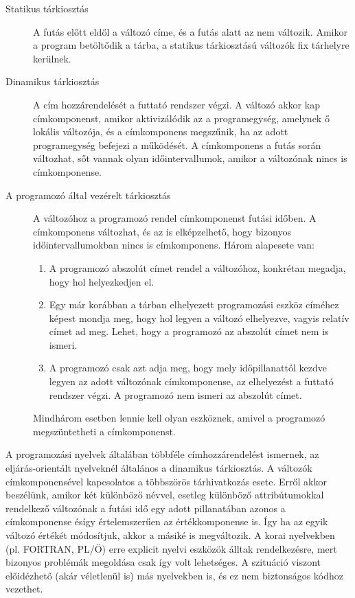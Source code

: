 \begin{description}
	\item[Statikus tárkiosztás] A futás előtt eldől a változó címe, és a futás alatt az nem változik. Amikor a program betöltődik a tárba, a statikus tárkiosztású változók fix tárhelyre kerülnek.
	\item[Dinamikus tárkiosztás] A cím hozzárendelését a futtató rendszer végzi. A változó akkor kap címkomponenst, amikor aktivizálódik az a programegység, amelynek ő lokális változója, és a címkomponens megszűnik, ha az adott programegység befejezi a működését. A címkomponens a futás során változhat, sőt vannak olyan időintervallumok, amikor a változónak nincs is címkomponense. \item[A programozó által vezérelt tárkiosztás] A változóhoz a programozó rendel címkomponenst futási időben. A címkomponens változhat, és az is elképzelhető, hogy bizonyos időintervallumokban nincs is címkomponens. Három alapesete van:
	\begin{enumerate}[noitemsep]
		\item A programozó abszolút címet rendel a változóhoz, konkrétan megadja, hogy hol helyezkedjen el.
		\item Egy már korábban a tárban elhelyezett programozási eszköz címéhez képest mondja meg, hogy hol legyen a változó elhelyezve, vagyis relatív címet ad meg. Lehet, hogy a programozó az abszolút címet nem is ismeri.
		\item A programozó csak azt adja meg, hogy mely időpillanattól kezdve legyen az adott változónak   címkomponense, az elhelyezést a futtató rendszer végzi. A programozó nem ismeri az abszolút címet.
	\end{enumerate}
	Mindhárom esetben lennie kell olyan eszköznek, amivel a programozó megszüntetheti a címkomponenst.
\end{description}
A programozási nyelvek általában többféle címhozzárendelést ismernek, az eljárás-orientált nyelveknél általános a dinamikus tárkiosztás. A változók címkomponensével kapcsolatos a többszörös tárhivatkozás esete. Erről akkor beszélünk, amikor két különböző névvel, esetleg különböző attribútumokkal rendelkező változónak a futási idő egy adott pillanatában azonos a címkomponense ésígy értelemszerűen az értékkomponense is. Így ha az egyik  változó értékét módosítjuk, akkor a másiké is megváltozik. A korai nyelvekben (pl. FORTRAN, PL/Ő) erre explicit nyelvi eszközök álltak rendelkezésre, mert bizonyos problémák megoldása csak így volt lehetséges. A szituáció viszont előidézhető (akár véletlenül is) más nyelvekben is, és ez nem biztonságos kódhoz vezethet.

